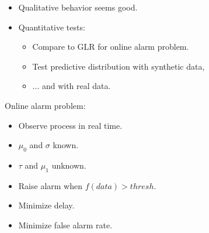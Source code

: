 \documentclass[pdf,allen]{prosper}
\begin{document}
\begin{slide}{}

\begin{itemize}

\item Qualitative behavior seems good. 

\item Quantitative tests:

\begin{itemize}

\item Compare to GLR for online alarm problem.

\item Test predictive distribution with synthetic data,

\item ... and with real data.

\end{itemize}

\end{itemize}

\end{slide}



\begin{slide}{}

Online alarm problem:

\begin{itemize}

\item Observe process in real time.

\item $\mu_0$ and $\sigma$ known.

\item $\tau$ and $\mu_1$ unknown.

\item Raise alarm when $f(data) > thresh$.

\item Minimize delay.

\item Minimize false alarm rate.

\end{itemize}


\end{slide}
\end{document}
